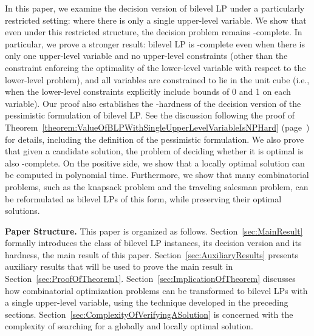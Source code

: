 \documentclass[runningheads,orivec]{llncs}
\newcommand{\EtAl}{\textit{et al.}}
\newcommand{\MacroColor}[1]{#1}
\newcommand{\ComplexityClassStyle}[1]{#1}
\newcommand{\ClassNP}{\MacroColor{\text{\ComplexityClassStyle{NP}}}}
\newcommand{\ClassCoNP}{\MacroColor{\text{\ComplexityClassStyle{coNP}}}}
\begin{document}

In this paper, we examine the decision version of bilevel LP under a particularly restricted setting: where there is only a single upper-level variable.
We show that even under this restricted structure, the decision problem remains \ClassNP{}-complete.
In particular, we prove a stronger result: bilevel LP is \ClassNP{}-complete even when there is only one upper-level variable and no upper-level constraints (other than the constraint enforcing the optimality of the lower-level variable with respect to the lower-level problem), and all variables are constrained to lie in the unit cube (i.e., when the lower-level constraints explicitly include bounds of 0 and 1 on each variable).
Our proof also establishes the \ClassNP{}-hardness of the decision version of the pessimistic formulation of bilevel LP. See the discussion following the proof of Theorem~\ref{theorem:ValueOfBLPWithSingleUpperLevelVariableIsNPHard} (page~\pageref{Rev:Pessimistic}) for details, including the definition of the pessimistic formulation.
We also prove that given a candidate solution, the problem of deciding whether it is optimal is also \ClassCoNP{}-complete.
On the positive side, we show that a locally optimal solution can be computed in polynomial time.
Furthermore, we show that many combinatorial problems, such as the knapsack problem and the traveling salesman problem, can be reformulated as bilevel LPs of this form, while preserving their optimal solutions.

\textbf{Paper Structure.}
This paper is organized as follows.
Section~\ref{sec:MainResult} formally introduces the class of bilevel LP instances, its decision version and its hardness, the main result of this paper.
Section~\ref{sec:AuxiliaryResults} presents auxiliary results that will be used to prove the main result in Section~\ref{sec:ProofOfTheorem1}.
Section~\ref{sec:ImplicationOfTheorem} discusses how combinatorial optimization problems can be transformed to bilevel LPs with a single upper-level variable, using the technique developed in the preceding sections.
Section~\ref{sec:ComplexityOfVerifyingASolution} is concerned with the complexity of searching for a globally and locally optimal solution.
\end{document}

